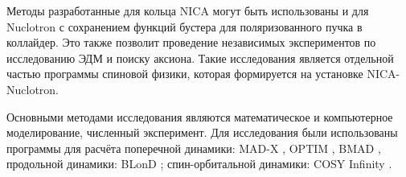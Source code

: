 \par Методы разработанные для кольца NICA могут быть использованы и для Nuclotron с сохранением функций бустера для поляризованного пучка в коллайдер. Это также позволит проведение независимых экспериментов по исследованию ЭДМ и поиску аксиона. Такие исследования является отдельной частью программы спиновой физики, которая формируется на уста­новке NICA-Nuclotron.


\par {\methods} Основными методами исследования являются математическое и компьютерное моделирование, численный эксперимент. Для исследования были использованы программы для расчёта поперечной динамики: MAD-X \autocite{madx}, OPTIM \autocite{optim}, BMAD \autocite{bmad}, продольной динамики: BLonD \autocite{blond}; спин-орбитальной динамики: COSY Infinity \autocite{cosy}.
~\\

